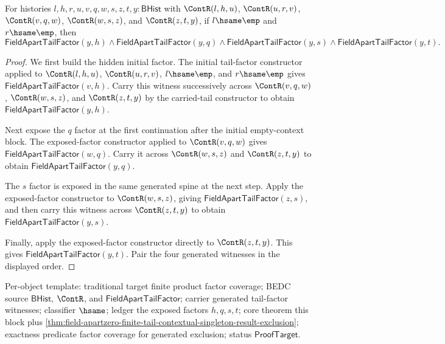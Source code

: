 \begin{theorem}
\label{thm:field-apartzero-three-tail-tail-factor-coverage}
For histories $l,h,r,u,v,q,w,s,z,t,y:\mathsf{BHist}$ with
$\ContR(l,h,u)$, $\ContR(u,r,v)$, $\ContR(v,q,w)$, $\ContR(w,s,z)$, and
$\ContR(z,t,y)$, if $l\hsame\emp$ and $r\hsame\emp$, then
$$
\mathsf{FieldApartTailFactor}(y,h)
\land
\mathsf{FieldApartTailFactor}(y,q)
\land
\mathsf{FieldApartTailFactor}(y,s)
\land
\mathsf{FieldApartTailFactor}(y,t).
$$
\end{theorem}
\begin{proof}
We first build the hidden initial factor. The initial tail-factor constructor
applied to $\ContR(l,h,u)$, $\ContR(u,r,v)$, $l\hsame\emp$, and
$r\hsame\emp$ gives $\mathsf{FieldApartTailFactor}(v,h)$. Carry this witness
successively across $\ContR(v,q,w)$, $\ContR(w,s,z)$, and $\ContR(z,t,y)$ by
the carried-tail constructor to obtain $\mathsf{FieldApartTailFactor}(y,h)$.

Next expose the $q$ factor at the first continuation after the initial
empty-context block. The exposed-factor constructor applied to
$\ContR(v,q,w)$ gives $\mathsf{FieldApartTailFactor}(w,q)$. Carry it across
$\ContR(w,s,z)$ and $\ContR(z,t,y)$ to obtain
$\mathsf{FieldApartTailFactor}(y,q)$.

The $s$ factor is exposed in the same generated spine at the next step.
Apply the exposed-factor constructor to $\ContR(w,s,z)$, giving
$\mathsf{FieldApartTailFactor}(z,s)$, and then carry this witness across
$\ContR(z,t,y)$ to obtain $\mathsf{FieldApartTailFactor}(y,s)$.

Finally, apply the exposed-factor constructor directly to $\ContR(z,t,y)$.
This gives $\mathsf{FieldApartTailFactor}(y,t)$. Pair the four generated
witnesses in the displayed order.
\end{proof}

Per-object template: traditional target finite product factor coverage; BEDC
source $\mathsf{BHist}$, $\ContR$, and $\mathsf{FieldApartTailFactor}$;
carrier generated tail-factor witnesses; classifier $\hsame$; ledger the
exposed factors $h,q,s,t$; core theorem this block plus
\autoref{thm:field-apartzero-finite-tail-contextual-singleton-result-exclusion};
exactness predicate factor coverage for generated exclusion; status
$\mathsf{ProofTarget}$.
